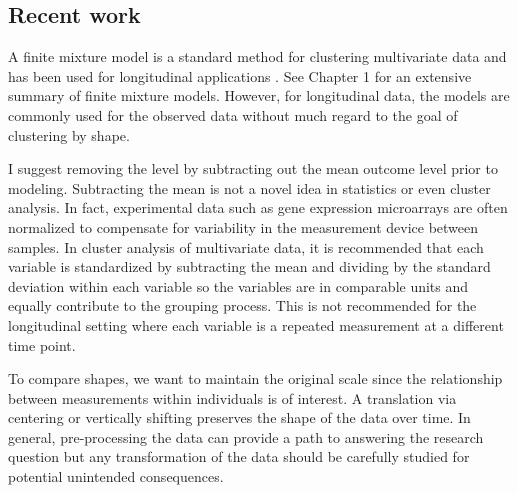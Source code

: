 \subsection{Recent work}
A finite mixture model is a standard method for clustering multivariate data \cite{everitt2009} and has been used for longitudinal applications \cite{muthen2010, jones2001}. See Chapter 1 for an extensive summary of finite mixture models. However, for longitudinal data, the models are commonly used for the observed data without much regard to the goal of clustering by shape. 

I suggest removing the level by subtracting out the mean outcome level prior to modeling. Subtracting the mean is not a novel idea in statistics or even cluster analysis. In fact, experimental data such as gene expression microarrays are often normalized to compensate for variability in the measurement device between samples. In cluster analysis of multivariate data, it is recommended that each variable is standardized by subtracting the mean and dividing by the standard deviation within each variable so the variables are in comparable units and equally contribute to the grouping process. This is not recommended for the longitudinal setting where each variable is a repeated measurement at a different time point. 

To compare shapes, we want to maintain the original scale since the relationship between measurements within individuals is of interest. A translation via centering \cite{chiou2008} or vertically shifting preserves the shape of the data over time. In general, pre-processing the data can provide a path to answering the research question but any transformation of the data should be carefully studied for potential unintended consequences.

